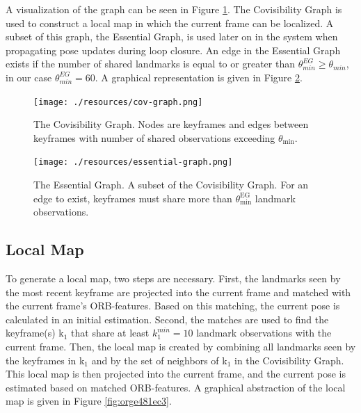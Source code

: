 \documentclass[a4paper, 10pt]{article}
\begin{document}
A visualization of the graph can be seen in Figure \ref{fig:org8ccb555}. The Covisibility Graph is used to construct a local map in which the current frame can be localized.
A subset of this graph, the Essential Graph, is used later on in the system when propagating pose updates during loop closure. An edge in the Essential Graph exists if the number of shared landmarks is 
equal to or greater than \(\theta_{min}^{EG} \geq \theta_{min}\), in our case \(\theta_{min}^{EG}=60\). A graphical representation is given in Figure \ref{fig:org7574692}.

\begin{figure}[htbp]
\centering
\texttt{[image: ./resources/cov-graph.png]}
\caption{\label{fig:org8ccb555}
The Covisibility Graph. Nodes are keyframes and edges between keyframes with number of shared observations exceeding \(\theta_{\text{min}}\).}
\end{figure}

\begin{figure}[htbp]
\centering
\texttt{[image: ./resources/essential-graph.png]}
\caption{\label{fig:org7574692}
The Essential Graph. A subset of the Covisibility Graph. For an edge to exist, keyframes must share more than \(\theta_{\text{min}}^{\text{EG}}\) landmark observations.}
\end{figure}

\subsection{Local Map}
\label{sec:org59ded6e}
To generate a local map, two steps are necessary. First, the landmarks seen by the most recent keyframe are projected into the current frame and matched with the current frame’s ORB-features.
Based on this matching, the current pose is calculated in an initial estimation. Second, the matches are used to find the keyframe(s) k\(_{\text{1}}\) that share at least \(k_1^{min}=10\) landmark observations with the current frame.
Then, the local map is created by combining all landmarks seen by the keyframes in k\(_{\text{1}}\) and by the set of neighbors of k\(_{\text{1}}\) in the Covisibility Graph.
This local map is then projected into the current frame, and the current pose is estimated based on matched ORB-features. A graphical abstraction of the local map is given in Figure \ref{fig:orge481ec3}.
\end{document}
